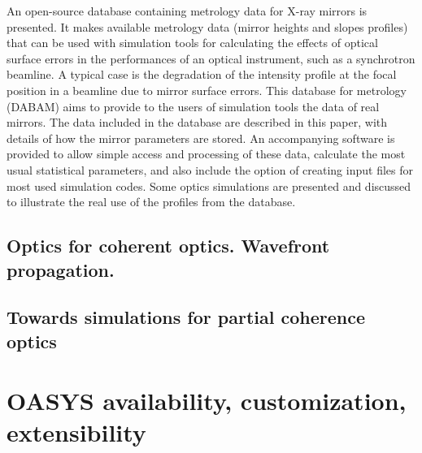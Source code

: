 \documentclass{aip-cp}
\begin{document}
An open-source database containing metrology data for X-ray mirrors is presented. It makes available metrology data (mirror heights and slopes profiles) that can be used with simulation tools for calculating the effects of optical surface errors in the performances of an optical instrument, such as a synchrotron beamline. A typical case is the degradation of the intensity profile at the focal position in a beamline due to mirror surface errors. This database for metrology (DABAM) aims to provide to the users of simulation tools the data of real mirrors. The data included in the database are described in this paper, with details of how the mirror parameters are stored. An accompanying software is provided to allow simple access and processing of these data, calculate the most usual statistical parameters, and also include the option of creating input files for most used simulation codes. Some optics simulations are presented and discussed to illustrate the real use of the profiles from the database.


\subsection{Optics for coherent optics. Wavefront propagation.}

\subsection{Towards simulations for partial coherence optics}

\section{OASYS availability, customization, extensibility}
\end{document}
